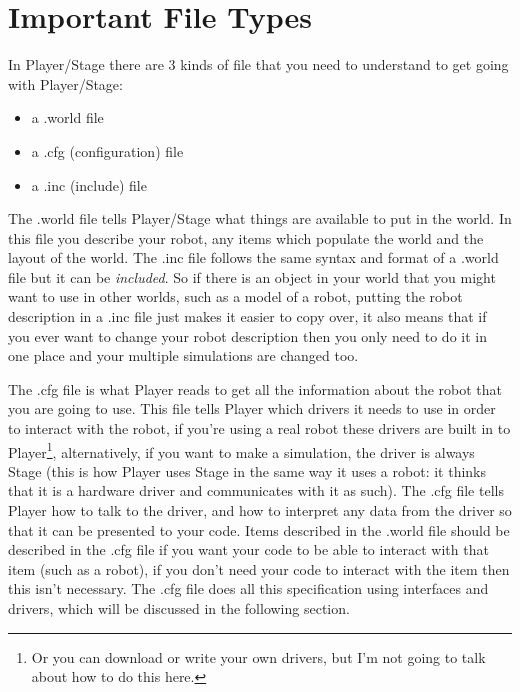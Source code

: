 \documentclass[a4paper]{report}
\newcommand{\plst}{Player/Stage\xspace}
\newcommand{\pl}{Player\xspace}
\begin{document}
\section{Important File Types}\label{sec:Basics:FileTypes}
In \plst there are 3 kinds of file that you need to understand to get going with \plst:
\begin{itemize}
	\item a .world file
	\item a .cfg (configuration) file
	\item a .inc (include) file
\end{itemize}
The .world file tells \plst what things are available to put in the world. In this file you describe your robot, any items which populate the world and the layout of the world. The .inc file follows the same syntax and format of a .world file but it can be \emph{included}. So if there is an object in your world that you might want to use in other worlds, such as a model of a robot, putting the robot description in a .inc file just makes it easier to copy over, it also means that if you ever want to change your robot description then you only need to do it in one place and your multiple simulations are changed too.

The .cfg file is what \pl reads to get all the information about the robot that you are going to use.
This file tells \pl which drivers it needs to use in order to interact with the robot, if you're using a real robot these drivers are built in to \pl\footnote{Or you can download or write your own drivers, but I'm not going to talk about how to do this here.}, alternatively, if you want to make a simulation, the driver is always Stage (this is how \pl uses Stage in the same way it uses a robot: it thinks that it is a hardware driver and communicates with it as such). 
The .cfg file tells \pl how to talk to the driver, and how to interpret any data from the driver so that it can be presented to your code. Items described in the .world file should be described in the .cfg file if you want your code to be able to interact with that item (such as a robot), if you don't need your code to interact with the item then this isn't necessary. 
The .cfg file does all this specification using interfaces and drivers, which will be discussed in the following section.
\end{document}
